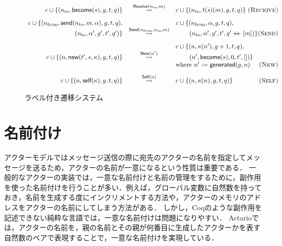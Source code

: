\begin{figure}[t]\centering
  \begin{displaymath}
    \begin{array}{rcl}
      c \cup \{(n_{\textrm{to}}, \textsf{become}(s), g, t, q)\} &
      \overset{\textsf{Receive}(n_{\textrm{to}}, m)}{\leadsto} &
      c \cup \{(n_{\textrm{to}}, t(s)(m), g, t, q)\}
      \hfill \textsc{(Receive)} \\[2ex]

      c \cup \{(n_{\textrm{from}}, \textsf{send}(n_{\textrm{to}}, m, \alpha), g, t, q),
      & &
      c \cup \{(n_{\textrm{from}}, \alpha, g, t, q), \\
      (n_{\textrm{to}}, \alpha', g', t', q')\} &
      \overset{\textsf{Send}(n_{\textrm{from}}, n_{\textrm{to}}, m)}{\leadsto} &
      \hspace{5ex} (n_{\textrm{to}}, \alpha', g', t', q' \doubleplus [m])\}
      \hfill \textsc{(Send)} \\[2ex]

      & & c \cup \{(n, \kappa(n'), g + 1, t, q), \\
      c \cup \{(n, \textsf{new}(t', s, \kappa), g, t, q)\} &
      \overset{\textsf{New}(n')}{\leadsto} &
      \hspace{5ex} (n', \textsf{become}(s), 0, t', [])\} \\
      & & \textrm{where}\ n' := \textsf{generated}(g, n)
      \hfill \textsc{(New)} \\[2ex]

      c \cup \{(n, \textsf{self}(\kappa), g, t, q)\} &
      \overset{\textsf{Self}(n)}{\leadsto} &
      c \cup \{(n, \kappa(n), g, t, q)\}
      \hfill \textsc{(Self)}
    \end{array}
  \end{displaymath}
  \caption{ラベル付き遷移システム}\label{expr:formalization:semantics}
\end{figure}

\section{名前付け}

アクターモデルではメッセージ送信の際に宛先のアクターの名前を指定してメッセージを送るため，アクターの名前が一意になるという性質は重要である．
一般的なアクターの実装では，一意な名前付けと名前の管理をするために，副作用を使った名前付けを行うことが多い．例えば，グローバル変数に自然数を持っておき，名前を生成する度にインクリメントする方法や，アクターのメモリのアドレスをアクターの名前にしてしまう方法がある．
しかし，Coqのような副作用を記述できない純粋な言語では，一意な名前付けは問題になりやすい．
Actarioでは，アクターの名前を，親の名前とその親が何番目に生成したアクターかを表す自然数のペアで表現することで，一意な名前付けを実現している．

